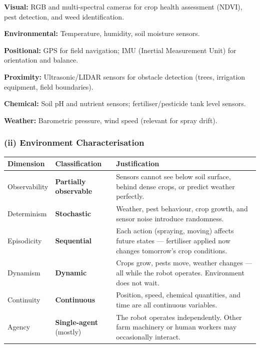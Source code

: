 \documentclass[12pt, a4paper]{article}
\begin{document}
\begin{keypoints}
  \item \textbf{Visual:} RGB and multi-spectral cameras for crop health assessment (NDVI), pest detection, and weed identification.
  \item \textbf{Environmental:} Temperature, humidity, soil moisture sensors.
  \item \textbf{Positional:} GPS for field navigation; IMU (Inertial Measurement Unit) for orientation and balance.
  \item \textbf{Proximity:} Ultrasonic/LIDAR sensors for obstacle detection (trees, irrigation equipment, field boundaries).
  \item \textbf{Chemical:} Soil pH and nutrient sensors; fertiliser/pesticide tank level sensors.
  \item \textbf{Weather:} Barometric pressure, wind speed (relevant for spray drift).
\end{keypoints}

\subsubsection*{(ii) Environment Characterisation}

\begin{center}
\renewcommand{\arraystretch}{1.3}
\begin{tabular}{l|l|l}
\toprule
\textbf{Dimension} & \textbf{Classification} & \textbf{Justification} \\
\midrule
Observability & \textbf{Partially observable} & Sensors cannot see below soil surface, behind dense crops, or predict weather perfectly. \\
Determinism & \textbf{Stochastic} & Weather, pest behaviour, crop growth, and sensor noise introduce randomness. \\
Episodicity & \textbf{Sequential} & Each action (spraying, moving) affects future states — fertiliser applied now changes tomorrow's crop conditions. \\
Dynamism & \textbf{Dynamic} & Crops grow, pests move, weather changes — all while the robot operates. Environment does not wait. \\
Continuity & \textbf{Continuous} & Position, speed, chemical quantities, and time are all continuous variables. \\
Agency & \textbf{Single-agent} (mostly) & The robot operates independently. Other farm machinery or human workers may occasionally interact. \\
\bottomrule
\end{tabular}
\end{center}
\end{document}
